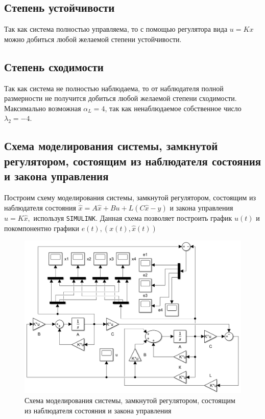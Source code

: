 \documentclass[a4paper, 12pt]{article}
\begin{document}
    
    \subsection{Степень устойчивости}
    Так как система полностью управляема, то с помощью регулятора вида $u=Kx$ можно добиться
    любой желаемой степени устойчивости.


    \subsection{Степень сходимости}
    Так как система не полностью наблюдаема, то от наблюдателя полной размерности не получится
    добиться любой желаемой степени сходимости. Максимально возможная $\alpha_L=4$, так как
    ненаблюдаемое собственное число $\lambda_2=-4$.


    \subsection{Схема моделирования системы, замкнутой регулятором, состоящим из наблюдателя состояния и закона управления}
    Построим схему моделирования системы, замкнутой регулятором, состоящим из наблюдателя состояния
    $\dot{\hat{x}}=A\hat{x}+Bu+L\left( C\hat{x}-y \right)$ и закона управления $u=K\hat{x},$ используя \texttt{SIMULINK}.
    Данная схема позволяет построить график $u(t)$ и покомпонентно графики $e(t),\left(x(t),\hat{x}(t)\right)$
    \begin{figure}[H]
        \centering
        \includegraphics[scale=0.5]{scheme_task2.png}
        \captionsetup{skip=0pt}
        \caption{Схема моделирования системы, замкнутой регулятором, состоящим из наблюдателя состояния и закона управления}
        \label{fig:scheme_task2}
    \end{figure}
\end{document}
